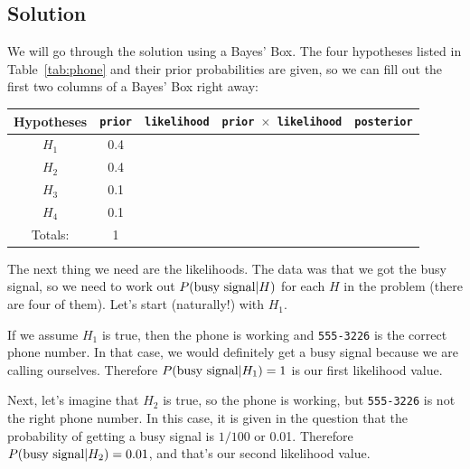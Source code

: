 \subsection{Solution}
We will go through the solution using a Bayes' Box. The four hypotheses listed
in Table~\ref{tab:phone} and their prior probabilities are given, so we can fill
out the first two columns of a Bayes' Box right away:
\begin{table}[h!]
\begin{center}
\begin{tabular}{|c|c|c|c|c|}
\hline
{\bf Hypotheses} & {\tt prior} & {\tt likelihood} &
{\tt prior $\times$ likelihood} & {\tt posterior}\\
\hline
$H_1$ & 0.4 &  &  & \\
$H_2$ & 0.4 &  &  & \\
$H_3$ & 0.1 &  &  & \\
$H_4$ & 0.1 &  &  & \\
\hline
Totals: & 1 & & & \\
\hline
\end{tabular}
\end{center}
\end{table}
The next thing we need are the likelihoods. The data was that we got the busy
signal, so we need to work out $P(\textnormal{busy signal} | H)$ for each $H$
in the problem (there are four of them). Let's start (naturally!) with $H_1$.

If we assume $H_1$ is true, then the phone is working and {\tt 555-3226} is the
correct phone number. In that case, we would definitely get a busy signal
because we are calling ourselves. Therefore
$P(\textnormal{busy signal} | H_1) = 1$ is our first likelihood value.

Next, let's imagine that $H_2$ is true, so the phone is working, but
{\tt 555-3226} is not the right phone number. In this case, it is given in the
question that the probability of getting a busy signal is $1/100$ or 0.01.
Therefore $P(\textnormal{busy signal} | H_2) = 0.01$, and that's our second
likelihood value.

